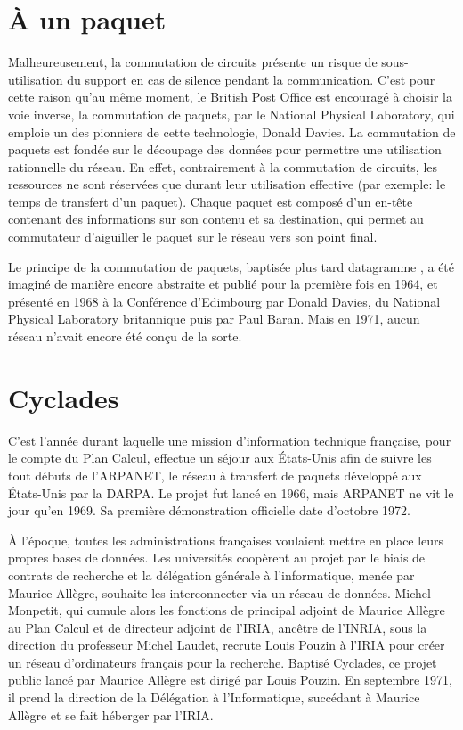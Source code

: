 \documentclass[12pt]{report}
\begin{document}
\section{À un paquet}

Malheureusement, la commutation de circuits présente un risque de sous-utilisation du support en cas de \og silence \fg pendant la communication.
C'est pour cette raison qu'au même moment, le British Post Office est encouragé à choisir la voie inverse, la commutation de paquets, par le National Physical Laboratory, qui emploie un des pionniers de cette technologie, Donald Davies. La commutation de paquets est fondée sur le découpage des données pour permettre une utilisation rationnelle du réseau. En effet, contrairement à la commutation de circuits, les ressources ne sont réservées que durant leur utilisation effective (par exemple: le temps de transfert d'un paquet). Chaque paquet est composé d'un en-tête contenant des informations sur son contenu et sa destination, qui permet au commutateur d'aiguiller le paquet sur le réseau vers son point final\cite{wikicp}.

Le principe de la commutation de paquets, baptisée plus tard \og datagramme \fg, a été imaginé de manière encore abstraite et publié pour la première fois en 1964, et présenté en 1968 à la Conférence d'Edimbourg par Donald Davies, du National Physical Laboratory britannique puis par Paul Baran. Mais en 1971, aucun réseau n'avait encore été conçu de la sorte.

\section{Cyclades}


C'est l'année durant laquelle une mission d'information technique française, pour le compte du Plan Calcul, effectue un séjour aux États-Unis afin de suivre les tout débuts de l'\gls{ARPANET}, le réseau à transfert de paquets développé aux États-Unis par la \gls{DARPA}. Le projet fut lancé en 1966, mais ARPANET ne vit le jour qu'en 1969. Sa première démonstration officielle date d'octobre 1972\cite{wikiarpa}.

À l'époque, toutes les administrations françaises voulaient mettre en place leurs propres bases de données. Les universités coopèrent au projet par le biais de contrats de recherche et la délégation générale à l'informatique, menée par Maurice Allègre, souhaite les interconnecter via un réseau de données. Michel Monpetit, qui cumule alors les fonctions de principal adjoint de Maurice Allègre au Plan Calcul et de directeur adjoint de l'IRIA, ancêtre de l'\gls{INRIA}, sous la direction du professeur Michel Laudet, recrute Louis Pouzin à l'IRIA pour créer un réseau d'ordinateurs français pour la recherche. Baptisé Cyclades, ce projet public lancé par Maurice Allègre est dirigé par Louis Pouzin. En septembre 1971, il prend la direction de la Délégation à l’Informatique, succédant à Maurice Allègre et se fait héberger par l’IRIA\cite{wikicyc}.
\end{document}
